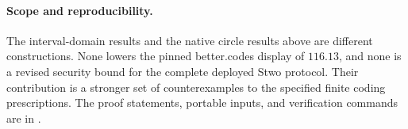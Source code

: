 \paragraph{Scope and reproducibility.}
The interval-domain results and the native circle results above are
different constructions. None lowers the pinned better.codes display of
$116.13$, and none is a revised security bound for the complete deployed
Stwo protocol. Their contribution is a stronger set of counterexamples
to the specified finite coding prescriptions. The proof statements,
portable inputs, and verification commands are in
.
